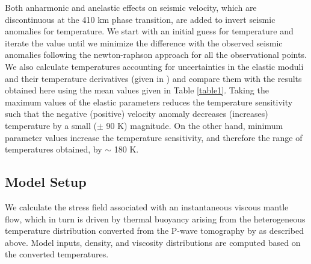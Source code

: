 \documentclass[draft,linenumbers]{agujournal2018}
\begin{document}
Both anharmonic and anelastic effects on seismic velocity, which are discontinuous at the 410 km phase transition, are added to invert seismic anomalies for temperature. We start with an initial guess for temperature and iterate the value until we minimize the difference with the observed seismic anomalies following the newton-raphson approach for all the observational points. We also calculate temperatures accounting for uncertainties in the elastic moduli and their temperature derivatives (given in \citet{Cammarano2003}) and compare them with the results obtained here using the mean values given in Table \ref{table1}. Taking the maximum values of the elastic parameters reduces the temperature sensitivity such that the negative (positive) velocity anomaly decreases (increases) temperature by a small ($\pm$ 90 K) magnitude. On the other hand, minimum parameter values increase the temperature sensitivity, and therefore the range of temperatures obtained, by $\sim$ 180 K. 

\subsection{Model Setup}
    We calculate the stress field associated with an instantaneous viscous mantle flow, which in turn is driven by thermal buoyancy arising from the heterogeneous temperature distribution converted from the P-wave tomography by \citet{Biryol_2016} as described above. Model inputs, density, and viscosity distributions are computed based on the converted temperatures. 
    
\end{document}
